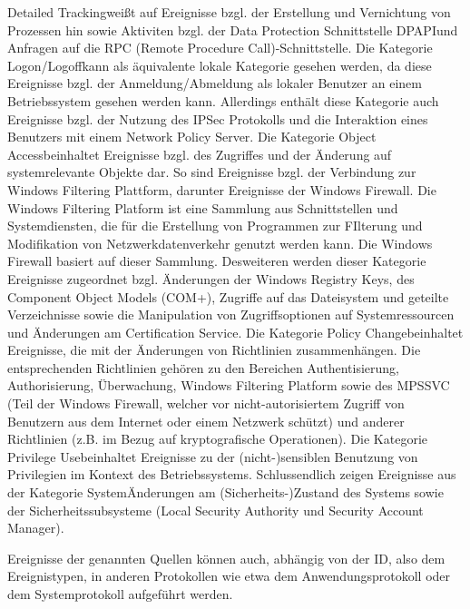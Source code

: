 \glqq Detailed Tracking\grqq weißt auf Ereignisse bzgl. der Erstellung und Vernichtung von Prozessen hin sowie Aktiviten bzgl. der Data Protection Schnittstelle \glqq DPAPI\grqq und Anfragen auf die RPC (Remote Procedure Call)-Schnittstelle.
Die Kategorie \glqq Logon/Logoff\grqq kann als äquivalente lokale Kategorie gesehen werden, da diese Ereignisse bzgl. der Anmeldung/Abmeldung als lokaler Benutzer an einem Betriebssystem gesehen werden kann. Allerdings enthält diese Kategorie auch Ereignisse bzgl. der Nutzung des IPSec Protokolls und die Interaktion eines Benutzers mit einem Network Policy Server. 
Die Kategorie \glqq Object Access\grqq beinhaltet Ereignisse bzgl. des Zugriffes und der Änderung auf systemrelevante Objekte dar. So sind Ereignisse bzgl. der Verbindung zur Windows Filtering Plattform, darunter Ereignisse der Windows Firewall. Die Windows Filtering Platform ist eine Sammlung aus Schnittstellen und Systemdiensten, die für die Erstellung von Programmen zur FIlterung und Modifikation von Netzwerkdatenverkehr genutzt werden kann. Die Windows Firewall basiert auf dieser Sammlung.
Desweiteren werden dieser Kategorie Ereignisse zugeordnet bzgl. Änderungen der Windows Registry Keys, des Component Object Models (COM+), Zugriffe auf das Dateisystem und geteilte Verzeichnisse sowie die Manipulation von Zugriffsoptionen auf Systemressourcen und Änderungen am Certification Service.
Die Kategorie \glqq Policy Change\grqq beinhaltet Ereignisse, die mit der Änderungen von Richtlinien zusammenhängen. Die entsprechenden Richtlinien gehören zu den Bereichen Authentisierung, Authorisierung, Überwachung, Windows Filtering Platform sowie des MPSSVC (Teil der Windows Firewall, welcher vor nicht-autorisiertem Zugriff von Benutzern aus dem Internet oder einem Netzwerk schützt) und anderer Richtlinien (z.B. im Bezug auf kryptografische Operationen). %
Die Kategorie \glqq Privilege Use\grqq beinhaltet Ereignisse zu der (nicht-)sensiblen Benutzung von Privilegien im Kontext des Betriebssystems. 
Schlussendlich zeigen Ereignisse aus der Kategorie \glqq System\grqq Änderungen am (Sicherheits-)Zustand des Systems sowie der Sicherheitssubsysteme (Local Security Authority und Security Account Manager).

Ereignisse der genannten Quellen können auch, abhängig von der ID, also dem Ereignistypen, in anderen Protokollen wie etwa dem Anwendungsprotokoll oder dem Systemprotokoll aufgeführt werden.

